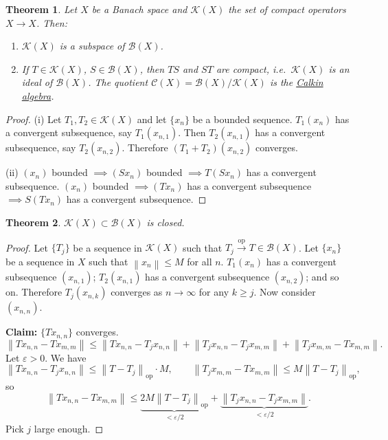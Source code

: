 \documentclass[12pt]{article}
\newcommand{\norm}[1]{\left\| #1 \right\|}
\newcommand{\cB}{\mathcal{B}}
\newcommand{\cK}{\mathcal{K}}
\newcommand{\cC}{\mathcal{C}}
\newtheorem{thm}{Theorem}[section]
\theoremstyle{definition}
\begin{document}
\begin{thm}
	Let $X$ be a Banach space and $\cK(X)$ the set of compact operators $X \to X$.
	Then:
	\begin{enumerate}[label=(\roman*),nosep]
		\item $\cK(X)$ is a subspace of $\cB(X)$.
		\item If $T \in \cK(X)$, $S \in \cB(X)$, then $TS$ and $ST$ are compact, i.e.\ $\cK(X)$ is an ideal of $\cB(X)$.
		The quotient $\cC(X) = \cB(X)/\cK(X)$ is the \underline{Calkin algebra}.
	\end{enumerate}
\end{thm}
\begin{proof}
	(i) Let $T_1, T_2 \in \cK(X)$ and let $\lbrace x_n \rbrace$ be a bounded sequence.
	$T_1(x_n)$ has a convergent subsequence, say $T_1(x_{n,1})$.
	Then $T_2(x_{n,1})$ has a convergent subsequence, say $T_2(x_{n,2})$.
	Therefore $(T_1 + T_2)(x_{n,2})$ converges.

	(ii) $(x_n)$ bounded $\implies (Sx_n)$ bounded $\implies T(Sx_n)$ has a convergent subsequence.
	$(x_n)$ bounded $\implies (Tx_n)$ has a convergent subsequence $\implies S(Tx_n)$ has a convergent subsequence.
\end{proof}

\begin{thm}
	$\cK(X) \subset \cB(X)$ is closed.
\end{thm}
\begin{proof}
	Let $\lbrace T_j \rbrace$ be a sequence in $\cK(X)$ such that $T_j \xrightarrow{\mathrm{op}} T \in \cB(X)$.
	Let $\lbrace x_n \rbrace$ be a sequence in $X$ such that $\norm{x_n} \leq M$ for all $n$.
	$T_1(x_n)$ has a convergent subsequence $(x_{n,1})$;
	$T_2(x_{n,1})$ has a convergent subsequence $(x_{n,2})$;
	and so on.
	Therefore $T_j(x_{n,k})$ converges as $n \to \infty$ for any $k \geq j$.
	Now consider $(x_{n,n})$.

	\textbf{Claim: } $\lbrace Tx_{n,n} \rbrace$ converges.
	\begin{equation*}
		\norm{Tx_{n,n} - Tx_{m,m}} \leq \norm{Tx_{n,n} - T_jx_{n,n}} + \norm{T_jx_{n,n} - T_jx_{m,m}} + \norm{T_jx_{m,m} - Tx_{m,m}}.
	\end{equation*}
	Let $\varepsilon > 0$.
	We have
	\begin{equation*}
		\norm{Tx_{n,n} - T_jx_{n,n}} \leq \norm{T - T_j}_{\mathrm{op}} \cdot M, \qquad \norm{T_jx_{m,m} - Tx_{m,m}} \leq M \norm{T-T_j}_{\mathrm{op}},
	\end{equation*}
	so
	\begin{equation*}
		\norm{Tx_{n,n} - Tx_{m,m}} \leq \underbrace{2M \norm{T-T_j}_{\mathrm{op}}}_{< \varepsilon/2} + \underbrace{\norm{T_j x_{n,n} - T_j x_{m,m}}}_{< \varepsilon/2}.
	\end{equation*}
	Pick $j$ large enough.
\end{proof}
\end{document}
